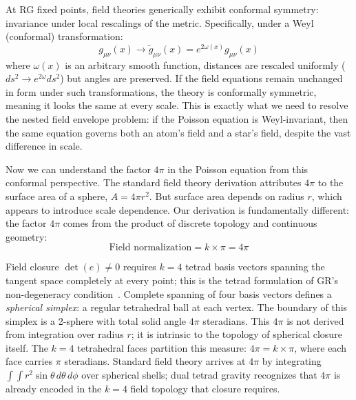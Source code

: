 \documentclass[aps,prd,preprint,superscriptaddress,showpacs,preprintnumbers,amsmath,amssymb,nofootinbib]{revtex4-2}
\begin{document}
At RG fixed points, field theories generically exhibit conformal symmetry: invariance under local rescalings of the metric. Specifically, under a Weyl (conformal) transformation:
\begin{equation}
g_{\mu\nu}(x) \to \tilde{g}_{\mu\nu}(x) = e^{2\omega(x)} g_{\mu\nu}(x)
\label{eq:weyl-transformation}
\end{equation}
where $\omega(x)$ is an arbitrary smooth function, distances are rescaled uniformly ($ds^2 \to e^{2\omega} ds^2$) but angles are preserved. If the field equations remain unchanged in form under such transformations, the theory is conformally symmetric, meaning it looks the same at every scale. This is exactly what we need to resolve the nested field envelope problem: if the Poisson equation is Weyl-invariant, then the same equation governs both an atom's field and a star's field, despite the vast difference in scale.

Now we can understand the factor $4\pi$ in the Poisson equation from this conformal perspective. The standard field theory derivation attributes $4\pi$ to the surface area of a sphere, $A = 4\pi r^2$. But surface area depends on radius $r$, which appears to introduce scale dependence. Our derivation is fundamentally different: the factor $4\pi$ comes from the product of discrete topology and continuous geometry:
\begin{equation}
\text{Field normalization} = k \times \pi = 4\pi
\label{eq:field-normalization}
\end{equation}

Field closure $\det(e) \neq 0$ requires $k=4$ tetrad basis vectors spanning the tangent space completely at every point; this is the tetrad formulation of GR's non-degeneracy condition~\cite{mtw1973,wald1984}. Complete spanning of four basis vectors defines a \emph{spherical simplex}: a regular tetrahedral ball at each vertex. The boundary of this simplex is a 2-sphere with total solid angle $4\pi$ steradians. This $4\pi$ is not derived from integration over radius $r$; it is intrinsic to the topology of spherical closure itself. The $k=4$ tetrahedral faces partition this measure: $4\pi = k \times \pi$, where each face carries $\pi$ steradians. Standard field theory arrives at $4\pi$ by integrating $\int\int r^2 \sin\theta\,d\theta\,d\phi$ over spherical shells; dual tetrad gravity recognizes that $4\pi$ is already encoded in the $k=4$ field topology that closure requires.
\end{document}
